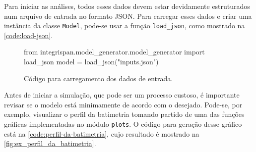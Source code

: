 
Para iniciar as análises, todos esses dados devem estar devidamente estruturados num arquivo de entrada no formato JSON.
Para carregar esses dados e criar uma instância da classe \texttt{Model}, pode-se usar a função \texttt{load\_json}, como mostrado na \autoref{code:load-json}.


\begin{figure} %
	\caption{Código para carregamento dos dados de entrada.}\label{code:load-json}
	\begin{pythoncode}
from integrispan.model_generator.model_generator import load_json
model = load_json("inputs.json")
	\end{pythoncode}
\end{figure}

Antes de iniciar a simulação, que pode ser um processo custoso, é importante revisar se o modelo está minimamente de acordo com o desejado. Pode-se, por exemplo, visualizar o perfil da batimetria tomando partido de uma das funções gráficas implementadas no módulo \texttt{plots}. O código para geração desse gráfico está na \autoref{code:perfil-da-batimetria}, cujo resultado é mostrado na \autoref{fig:ex_perfil_da_batimetria}.


